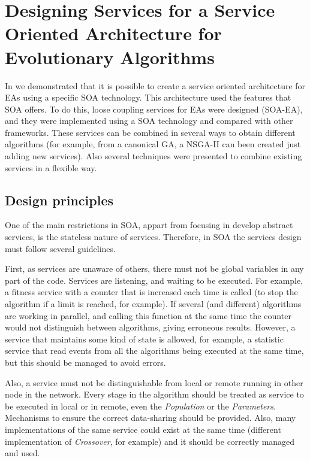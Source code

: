 \documentclass{sig-alternate}
\begin{document}
\section{Designing Services for a Service Oriented Architecture for Evolutionary Algorithms}
\label{sec:design}

In \cite{OSGILIATH} we demonstrated that it is possible to create a service oriented architecture for EAs using a specific SOA technology. This architecture used the features that SOA offers. To do this, loose coupling services for EAs were designed (SOA-EA), and they were implemented using a SOA technology and compared with other frameworks. These services can be combined in several ways to obtain different algorithms (for example, from a canonical GA, a NSGA-II can been created just adding new services). Also several techniques were presented to combine existing services in a flexible way.



\subsection{Design principles}


One of the main restrictions in SOA, appart from focusing in develop abstract services, is the stateless nature of services. Therefore, in SOA the services design must follow several guidelines.

First, as services are unaware of others, there must not be global variables in any part of the code. Services are listening, and waiting to be executed. For example, a fitness service with a counter that is increased each time is called (to stop the algorithm if a limit is reached, for example). If several (and different) algorithms are working in parallel, and calling this function at the same time the counter would not distinguish between algorithms, giving erroneous results. However, a service that maintains some kind of state is allowed, for example, a statistic service that read events from all the algorithms being executed at the same time, but this should be managed to avoid errors.

Also, a service must not be distinguishable from local or remote running in other node in the network. Every stage in the algorithm should be treated as service to be executed in local or in remote, even the {\em Population} or the {\em Parameters}. Mechanisms to ensure the correct data-sharing should be provided. Also, many implementations of the same service could exist at the same time (different implementation of {\em Crossover}, for example) and it should be correctly managed and used.
\end{document}
